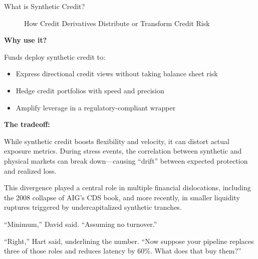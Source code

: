 \begin{TechnicalSidebar}{What is Synthetic Credit?}
\begin{figure}[H]
{%
    }
    \caption{How Credit Derivatives Distribute or Transform Credit Risk}
  \end{figure}

  \medskip
  
  \textbf{Why use it?}  

  \medskip

  Funds deploy synthetic credit to:

  \medskip
  
  \begin{itemize}
    \item Express directional credit views without taking balance sheet risk
    \item Hedge credit portfolios with speed and precision
    \item Amplify leverage in a regulatory-compliant wrapper
  \end{itemize}

  \medskip
  
  \textbf{The tradeoff:}  
  
  \medskip

  While synthetic credit boosts flexibility and velocity, it can distort actual exposure metrics. During stress events, 
  the correlation between synthetic and physical markets can break down—causing ``drift'' between expected protection 
  and realized loss.

  \medskip
  
  This divergence played a central role in multiple financial dislocations, including the 2008 collapse of AIG’s CDS 
  book, and more recently, in smaller liquidity ruptures triggered by undercapitalized synthetic tranches.
  
\end{TechnicalSidebar}

\medskip

``Minimum,'' David said. ``Assuming no turnover.''

``Right,'' Hart said, underlining the number. ``Now suppose your pipeline replaces three of those roles 
and reduces latency by 60\%. What does that buy them?''

